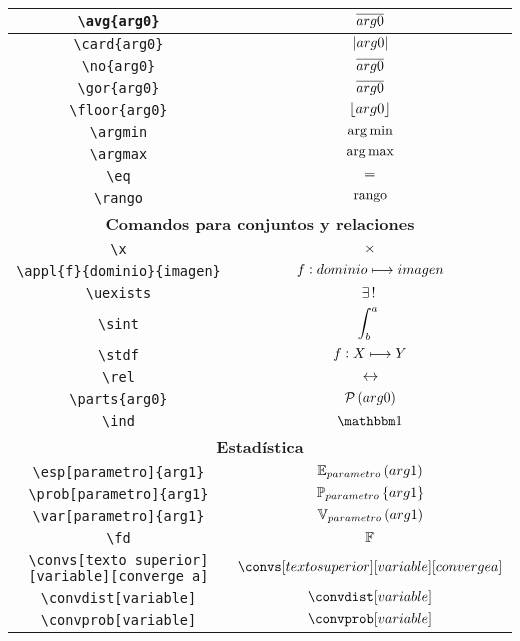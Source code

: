 \begin{longtable}{|c|c|}
\verb|\avg{arg0}| & $\displaystyle\overline{arg0}$ \\ \hline 
\verb|\card{arg0}| & $\displaystyle\left\vert arg0 \right\vert$ \\ \hline 
\verb|\no{arg0}| & $\displaystyle\overline{arg0}$ \\ \hline 
\verb|\gor{arg0}| & $\displaystyle\overline{arg0}$ \\ \hline 
\verb|\floor{arg0}| & $\displaystyle\left\lfloor arg0 \right\rfloor$ \\ \hline 
\verb|\argmin| & $\displaystyle\operatorname*{arg\,min}$ \\ \hline 
\verb|\argmax| & $\displaystyle\operatorname*{arg\,max}$ \\ \hline 
\verb|\eq| & $\displaystyle=$ \\ \hline 
\verb|\rango| & $\displaystyle\operatorname{rango}$ \\ \hline 
\multicolumn{2}{|c|}{\textbf{Comandos para conjuntos y relaciones}} \\ \hline 
\verb|\x| & $\displaystyle\times$ \\ \hline 
\verb|\appl{f}{dominio}{imagen}| & $\displaystyle f : dominio\longmapsto imagen$ \\ \hline 
\verb|\uexists| & $\displaystyle\exists\, !\;$ \\ \hline 
\verb|\sint| & $\displaystyle\int_b^a\;$ \\ \hline 
\verb|\stdf| & $\displaystyle f : X\longmapsto Y$ \\ \hline 
\verb|\rel| & $\displaystyle\rel$ \\ \hline 
\verb|\parts{arg0}| & $\displaystyle\mathcal{P}\left(arg0\right)$ \\ \hline 
\verb|\ind| & $\displaystyle\ind$ \\ \hline 
\multicolumn{2}{|c|}{\textbf{Estadística}} \\ \hline 
\verb|\esp[parametro]{arg1}| & $\displaystyle\esp[parametro]{arg1}$ \\ \hline 
\verb|\prob[parametro]{arg1}| & $\displaystyle\prob[parametro]{arg1}$ \\ \hline 
\verb|\var[parametro]{arg1}| & $\displaystyle\var[parametro]{arg1}$ \\ \hline 
\verb|\fd| & $\displaystyle\mathbb{F}$ \\ \hline 
\verb|\convs[texto superior][variable][converge a]| & $\displaystyle\convs[texto superior][variable][converge a]$ \\ \hline 
\verb|\convdist[variable]| & $\displaystyle\convdist[variable]$ \\ \hline 
\verb|\convprob[variable]| & $\displaystyle\convprob[variable]$ \\ \hline 

\end{longtable}
